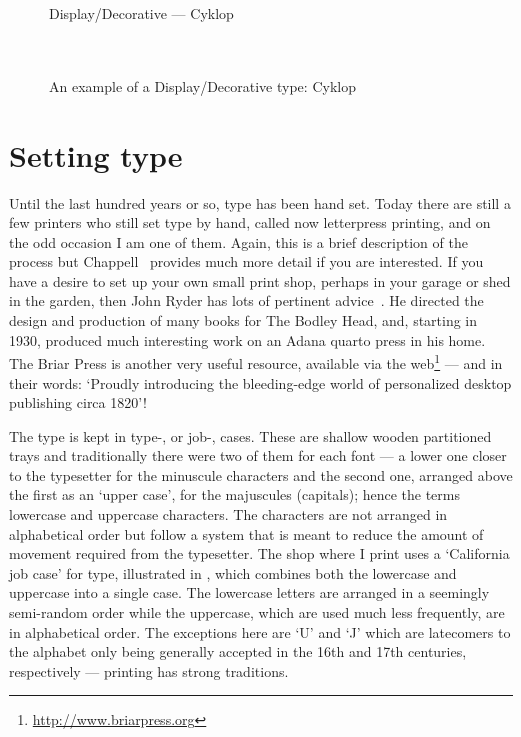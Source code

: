 \documentclass[10pt,a4paper,extrafontsizes]{memoir}
\newcommand{\PWnote}[2]{}
\begin{document}
\begin{figure}
\centering
{\centering{}\selectfont
  Display/Decorative --- Cyklop \\
  \UCalphabet \\
  \LCalphabet \\
  \fox\par}
\caption{An example of a Display/Decorative type: Cyklop} 
   \label{fig:cyklop}
\end{figure}

\section{Setting type}

\PWnote{2009/04/03}{Added bits and pieces about letterpress.}

\begin{paracol}{2}
\switchEng
   Until the last hundred years or so, type has been hand set. Today there
are still a few printers who still set type by hand, called 
now letterpress printing, and on the odd occasion I am 
one of them. Again, this is a brief description of the process but 
Chappell~\autocite{CHAPPELL99}
provides much more detail if you are interested. If you have a desire to
set up your own small print shop, perhaps in your garage or shed in the garden,
then John Ryder has lots of pertinent advice~\autocite{RYDER}. 
He directed
the design and production of many books for The Bodley Head, and, starting in
1930, produced much interesting work on an Adana 
quarto press in his home.
The Briar Press is another very useful resource, 
available via the web\label{briar}\footnote{\url{http://www.briarpress.org}} 
--- and in their words: `Proudly
introducing the bleeding-edge world of personalized desktop publishing
circa 1820'!

    The type is kept in type-, or job-, cases. 
These are shallow wooden 
partitioned trays and traditionally there were two of them for each font --- 
a lower one closer to the typesetter for the minuscule characters and the 
second one, arranged above the first as an `upper case', for the majuscules
(capitals); hence the terms lowercase and uppercase characters. The
characters are not arranged in alphabetical order but follow a system
that is meant to reduce the amount of movement required from the typesetter.
The shop where I print uses a `California job case' for type, 
illustrated in , which combines both the lowercase and 
uppercase into a single case. The lowercase letters are arranged in a 
seemingly semi-random order while the uppercase, which are used much less
frequently, are in alphabetical order. The exceptions here are `U' and `J' 
which are latecomers to the alphabet only being generally accepted in the 16th
and 17th centuries, respectively --- printing has strong traditions.
\end{paracol}
\end{document}
